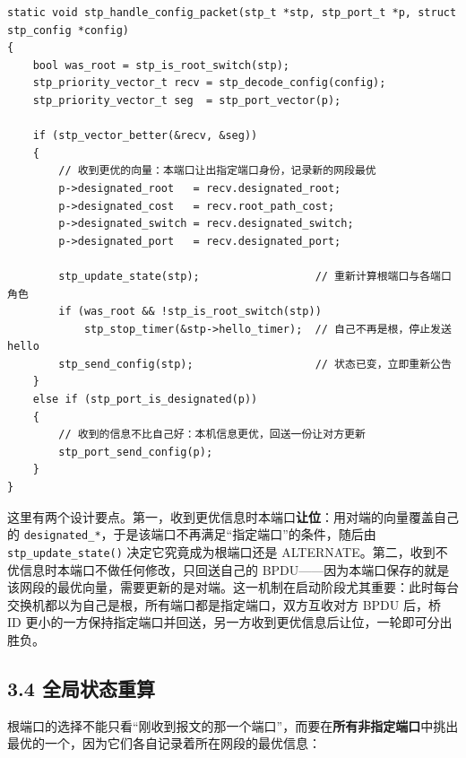 \documentclass[UTF8,12pt,a4paper,fontset=fandol]{ctexart}
\begin{document}
\begin{verbatim}
static void stp_handle_config_packet(stp_t *stp, stp_port_t *p, struct stp_config *config)
{
    bool was_root = stp_is_root_switch(stp);
    stp_priority_vector_t recv = stp_decode_config(config);
    stp_priority_vector_t seg  = stp_port_vector(p);

    if (stp_vector_better(&recv, &seg))
    {
        // 收到更优的向量：本端口让出指定端口身份，记录新的网段最优
        p->designated_root   = recv.designated_root;
        p->designated_cost   = recv.root_path_cost;
        p->designated_switch = recv.designated_switch;
        p->designated_port   = recv.designated_port;

        stp_update_state(stp);                  // 重新计算根端口与各端口角色
        if (was_root && !stp_is_root_switch(stp))
            stp_stop_timer(&stp->hello_timer);  // 自己不再是根，停止发送 hello
        stp_send_config(stp);                   // 状态已变，立即重新公告
    }
    else if (stp_port_is_designated(p))
    {
        // 收到的信息不比自己好：本机信息更优，回送一份让对方更新
        stp_port_send_config(p);
    }
}
\end{verbatim}

这里有两个设计要点。第一，收到更优信息时本端口\textbf{让位}：用对端的向量覆盖自己的 \texttt{designated\_*}，于是该端口不再满足“指定端口”的条件，随后由 \texttt{stp\_update\_state()} 决定它究竟成为根端口还是 ALTERNATE。第二，收到不优信息时本端口不做任何修改，只回送自己的 BPDU——因为本端口保存的就是该网段的最优向量，需要更新的是对端。这一机制在启动阶段尤其重要：此时每台交换机都以为自己是根，所有端口都是指定端口，双方互收对方 BPDU 后，桥 ID 更小的一方保持指定端口并回送，另一方收到更优信息后让位，一轮即可分出胜负。

\subsection*{3.4 全局状态重算}

根端口的选择不能只看“刚收到报文的那一个端口”，而要在\textbf{所有非指定端口}中挑出最优的一个，因为它们各自记录着所在网段的最优信息：
\end{document}
